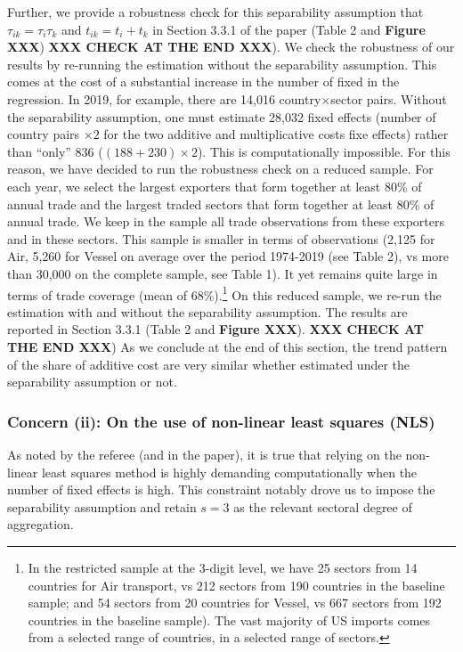 \documentclass[a4paper,11pt]{article}
\begin{document}
Further, we provide a robustness check for this separability assumption that $\tau_{ik} = \tau_i\tau_{k}$ and
 $t_{ik} = t_i +t_k$ in Section 3.3.1 of the paper (Table 2 and \textbf{Figure XXX}) \textbf{XXX CHECK AT THE END XXX}). We check the robustness of our results by re-running the estimation without the separability assumption. This comes at the cost of a substantial increase in the number of fixed in the regression. In 2019, for example, there are 14,016 country$\times$sector pairs. Without the separability assumption, one must estimate 28,032 fixed effects (number of country pairs $\times2$ for the two additive and multiplicative costs fixe effects) rather than ``only'' 836 ($(188+230)\times 2$). This is computationally impossible.
 For this reason, we have decided to run the robustness check on a reduced sample. For each year, we select the largest exporters that form together at least 80\% of annual trade and the largest traded sectors that form together at least 80\% of annual trade.
 We keep in the sample all trade observations from these exporters and in these sectors.
 This sample is smaller in terms of observations (2,125 for Air, 5,260 for Vessel on average over the period 1974-2019 (see Table 2), vs more than 30,000 on the complete sample, see Table 1). It yet remains quite large in terms of trade coverage (mean of 68\%).\footnote{In the restricted sample at the 3-digit level, we have 25 sectors from 14 countries for Air transport, vs 212 sectors from 190 countries in the baseline sample; and 54 sectors from 20 countries for Vessel, vs 667 sectors from 192 countries in the baseline sample). The vast majority of US imports comes from a selected range of countries, in a selected range of sectors.} On this reduced sample, we re-run the estimation with and without the separability assumption. The results are reported in Section 3.3.1 (Table 2 and \textbf{Figure XXX}). \textbf{XXX CHECK AT THE END XXX}) As we conclude at the end of this section, the trend pattern of the share of additive cost are very similar whether estimated under the separability assumption or not.


\subsubsection{Concern (ii): On the use of non-linear least squares (NLS)} As noted by the referee (and in the paper), it is true that relying on the non-linear least squares method is highly demanding computationally when the number of fixed effects is high. This constraint notably drove us to impose the separability assumption and retain $s=3$ as the relevant sectoral degree of aggregation.
\end{document}
